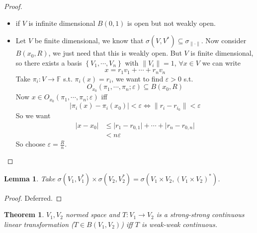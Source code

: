 \documentclass[11pt,a4paper]{article}
\theoremstyle{definition}
\theoremstyle{plain}
\newtheorem{theorem}[definition]{Theorem}
\newtheorem{lemma}[definition]{Lemma}
\theoremstyle{remark}
\newcommand{\F}{\mathbb{F}}
\renewcommand{\set}[1]{\left\{ #1 \right\}}
\newcommand{\abs}[1]{\lvert #1 \rvert}
\newcommand{\norm}[1]{\lVert #1 \rVert}
\newcommand{\1}{\mathbbm{1}}
\begin{document}
\begin{proof}
    \begin{itemize}
        \item[$\implies$] if $V$ is infinite dimensional $B(0, 1)$ is open but not weakly open. 
        \item[$\impliedby$] Let $V$ be finite dimensional, we know that $\sigma(V, V^*) \subseteq \sigma_{\norm{\cdot}}$. Now consider $B(x_0, R)$, 
        we just need that this is weakly open. But $V$ is finite dimensional, so there exists a basis $\set{V_1, \cdots, V_n}$ with $\norm{V_i} = 1$, $\forall x \in V$ we can write 
        $$x = r_1 v_1 + \cdots + r_n v_n$$
        Take $\pi_i \colon V \to \F$ s.t. $\pi_i(x) = r_i$, we want to find $\varepsilon > 0$ s.t. 
        $$O_{x_0} (\pi_1, \cdots, \pi_n; \varepsilon) \subseteq B(x_0, R)$$
        Now $x \in O_{x_0} (\pi_1, \cdots, \pi_n; \varepsilon)$ iff 
        $$\abs{\pi_i(x) - \pi_i(x_0)} < \varepsilon \iff \norm{r_i - r_{i_0}} < \varepsilon$$
        So we want 
        \begin{align*}
            \abs{x - x_0} &\le \abs{r_1 - r_{0,1}} + \cdots + \abs{r_n - r_{0,n}} \\
            &< n \varepsilon 
        \end{align*}
        So choose $\varepsilon = \frac{R}{n}$.
    \end{itemize}
\end{proof}

\begin{lemma}
    Take $\sigma(V_1, V_1^*) \times \sigma(V_2, V_2^*) = \sigma(V_1 \times V_2, (V_1 \times V_2)^*)$.  
\end{lemma}


\begin{proof}
    Deferred.
\end{proof}

\begin{theorem}
    $V_1, V_2$ normed space and $T \colon V_1 \to V_2$ is a strong-strong continuous linear transformation ($T \in B(V_1, V_2)$) iff $T$ is weak-weak continuous. 
\end{theorem}
\end{document}
